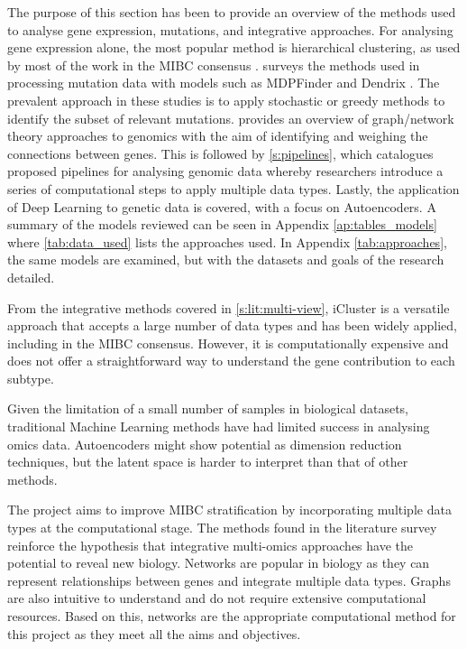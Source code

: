 The purpose of this section has been to provide an overview of the methods used to analyse gene expression, mutations, and integrative approaches. For analysing gene expression alone, the most popular method is hierarchical clustering, as used by most of the work in the MIBC consensus \cite{Kamoun2020-tj}.  surveys the methods used in processing mutation data with models such as MDPFinder \cite{Zhao2012-wj} and Dendrix \cite{Vandin2012-cf}. The prevalent approach in these studies is to apply stochastic or greedy methods to identify the subset of relevant mutations.  provides an overview of graph/network theory approaches to genomics with the aim of identifying and weighing the connections between genes. This is followed by \cref{s:pipelines}, which catalogues proposed pipelines for analysing genomic data whereby researchers introduce a series of computational steps to apply multiple data types. Lastly, the application of Deep Learning to genetic data is covered, with a focus on Autoencoders. A summary of the models reviewed can be seen in Appendix \cref{ap:tables_models} where \cref{tab:data_used} lists the approaches used. In Appendix \cref{tab:approaches}, the same models are examined, but with the datasets and goals of the research detailed.

From the integrative methods covered in \cref{s:lit:multi-view}, iCluster \cite{Shen2012-yj} is a versatile approach that accepts a large number of data types and has been widely applied, including in the MIBC consensus. However, it is computationally expensive and does not offer a straightforward way to understand the gene contribution to each subtype.

Given the limitation of a small number of samples in biological datasets, traditional Machine Learning methods have had limited success in analysing omics data. Autoencoders might show potential as dimension reduction techniques, but the latent space is harder to interpret than that of other methods.

The project aims to improve MIBC stratification by incorporating multiple data types at the computational stage. The methods found in the literature survey reinforce the hypothesis that integrative multi-omics approaches have the potential to reveal new biology. Networks are popular in biology as they can represent relationships between genes and integrate multiple data types. Graphs are also intuitive to understand and do not require extensive computational resources. Based on this, networks are the appropriate computational method for this project as they meet all the aims and objectives.